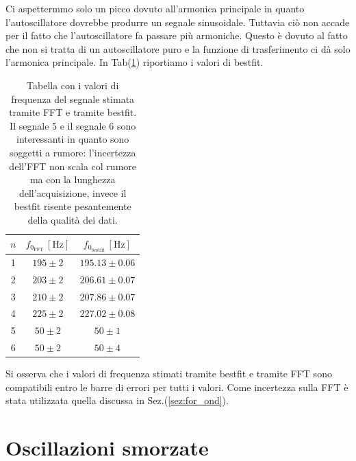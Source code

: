 \documentclass{article}
\begin{document}
    Ci aspettermmo solo un picco dovuto all'armonica principale in quanto
    l'autoscillatore dovrebbe produrre un segnale sinusoidale.
    Tuttavia ciò non accade per il fatto che l'autoscillatore fa passare più armoniche. 
    Questo è dovuto al fatto che non si tratta di un autoscillatore puro e 
    la funzione di trasferimento ci dà solo l'armonica principale.
    In Tab(\ref{tab:cft_rfft_bestfit}) riportiamo i valori di bestfit.

        \begin{table}[H]
            \centering
            \begin{tabular}{c c c}
                \toprule
                $n$ & $f_{0_\text{FFT}} \, [\text{Hz}]$ & $f_{0_\text{bestfit}} \, [\text{Hz}]$ \\
                \midrule
                1 & $195 \pm 2$         & $195.13 \pm 0.06$ \\
                2 & $203 \pm 2$       & $206.61 \pm 0.07$ \\
                3 & $210 \pm 2$         & $207.86 \pm 0.07$ \\
                4 & $225 \pm 2$         & $227.02 \pm 0.08$ \\
                5 & $50 \pm 2$          & $50 \pm 1$ \\
                6 & $50 \pm 2$          & $50 \pm 4$ \\
                \bottomrule
            \end{tabular}
            \caption{Tabella con i valori di frequenza del segnale stimata tramite FFT 
            e tramite bestfit. Il segnale 5 e il segnale 6 sono interessanti
            in quanto sono soggetti a rumore: l'incertezza dell'FFT non scala col rumore ma con
            la lunghezza dell'acquisizione, invece il bestfit risente pesantemente della qualità dei dati.}
            \label{tab:cft_rfft_bestfit}
        \end{table}
    Si osserva che i valori di frequenza stimati tramite bestfit e tramite FFT 
    sono compatibili entro le barre di errori per tutti i valori. 
    Come incertezza sulla FFT è stata utilizzata quella discussa in Sez.(\ref{sez:for_ond}).

\section{Oscillazioni smorzate}
\end{document}
